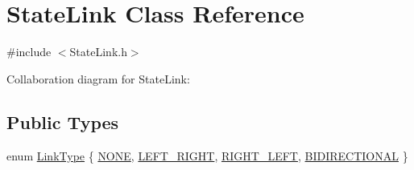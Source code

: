 \hypertarget{classStateLink}{}\section{State\+Link Class Reference}
\label{classStateLink}


{\ttfamily \#include $<$State\+Link.\+h$>$}



Collaboration diagram for State\+Link\+:
\subsection*{Public Types}
\begin{DoxyCompactItemize}
\item 
enum \hyperlink{classStateLink_a6392f74d9c3ccb368b0e7e57fec62272}{Link\+Type} \{ \hyperlink{classStateLink_a6392f74d9c3ccb368b0e7e57fec62272ad1ad147fc2ecdbe3153719ac80003b80}{N\+O\+NE}, 
\hyperlink{classStateLink_a6392f74d9c3ccb368b0e7e57fec62272a2c07cae102320cfec2037944aabcc87e}{L\+E\+F\+T\+\_\+\+R\+I\+G\+HT}, 
\hyperlink{classStateLink_a6392f74d9c3ccb368b0e7e57fec62272a91d382691d54740cd4f135b36369d88f}{R\+I\+G\+H\+T\+\_\+\+L\+E\+FT}, 
\hyperlink{classStateLink_a6392f74d9c3ccb368b0e7e57fec62272a9bb9f81a3fb1d34936de1dd395e5489d}{B\+I\+D\+I\+R\+E\+C\+T\+I\+O\+N\+AL}
 \}
\end{DoxyCompactItemize}
